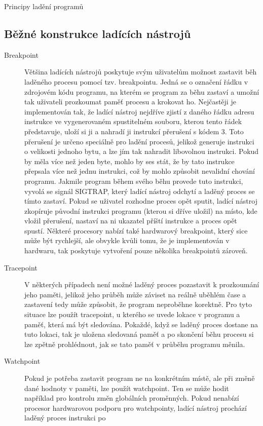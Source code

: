 \documentclass[bc,male,python,dept460]{diploma}						%
\begin{document}
\begin{section}{Principy ladění programů}
	\subsection{Běžné konstrukce ladících nástrojů}
		\begin{description}
			\item[Breakpoint]
				Většina ladících nástrojů poskytuje svým uživatelům možnost zastavit běh laděného procesu pomocí tzv. breakpointu.
				Jedná se o označení řádku v zdrojovém kódu programu, na kterém se program za běhu zastaví a umožní tak uživateli prozkoumat paměť procesu a krokovat ho.
				Nejčastěji je implementován tak, že ladící nástroj nejdříve zjistí z daného řádku adresu instrukce ve vygenerovaném spustitelném souboru, kterou tento
				řádek představuje, uloží si ji a nahradí ji instrukcí přerušení s kódem 3. Toto přerušení je určeno speciálně pro ladění procesů, jelikož generuje
				instrukci o velikosti jednoho bytu, a lze jím tak nahradit libovolnou instrukci\cite[306]{intel}. Pokud by měla více než jeden byte, mohlo by ses
				stát, že by tato instrukce přepsala více než jednu instrukci, což by mohlo způsobit nevalidní chování programu. Jakmile program během svého běhu
				provede tuto instrukci, vyvolá se signál SIGTRAP, který ladící nástroj odchytí a laděný proces se tímto zastaví. Pokud se uživatel rozhodne proces
				opět sputit, ladící nástroj zkopíruje původní instrukci programu (kterou si dříve uložil) na místo, kde vložil přerušení, nastaví na ni ukazatel
				příští instrukce a proces opět spustí.
				Některé procesory nabízí také hardwarový breakpoint, který sice může být rychlejší, ale obvykle kvůli tomu, že je implementován v hardwaru, tak poskytuje
				vytvoření pouze několika breakpointů zároveň.
			\item[Tracepoint]
				V některých případech není možné laděný proces pozastavit k prozkoumání jeho paměti, jelikož jeho průběh může záviset na reálně uběhlém čase a zastavení
				tedy může způsobit, že program neproběhne korektně. Pro tyto situace lze použít tracepoint, u kterého se uvede lokace v programu a paměť, která má být
				sledována. Pokaždé, když se laděný proces dostane na tuto lokaci, tak je uložena sledovaná paměť a po skončení běhu procesu si lze zpětně prohlédnout,
				jak se tato paměť v průběhu programu měnila.
			\item[Watchpoint]
				Pokud je potřeba zastavit program ne na konkrétním místě, ale při změně dané hodnoty v paměti, lze použít watchpoint. Ten se může hodit například pro
				kontrolu změn globálních proměnných. Pokud nenabízí procesor hardwarovou podporu pro watchpointy, ladící nástroj prochází laděný proces instrukci po

\end{description}
\end{section}
\end{document}
